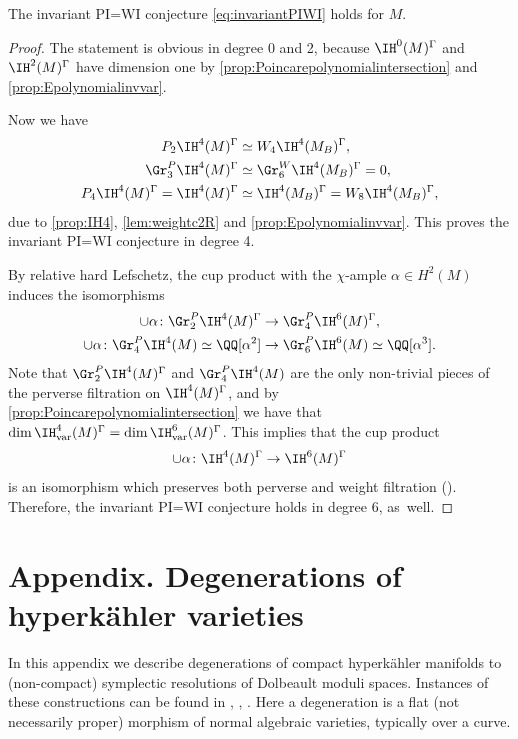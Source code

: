 \begin{thm}\label{thm:P=Winvar}
The invariant PI=WI conjecture \eqref{eq:invariantPIWI} holds for $M$.
\end{thm}
\begin{proof}
The statement is obvious in degree 0 and 2, because $\IH^0(M)^{\Gamma}$ and $\IH^2(M)^{\Gamma}$ have dimension one by \cref{prop:Poincarepolynomialintersection} and \cref{prop:Epolynomialinvvar}.

Now we have
\begin{align*}
P_2 \IH^4(M)^{\Gamma} & \simeq W_4 \IH^4(M_B)^{\Gamma},\\
\Gr^P_3 \IH^4(M)^{\Gamma} & \simeq \Gr^W_6 \IH^4(M_B)^{\Gamma} = 0, \\
P_4 \IH^4(M)^{\Gamma} = \IH^4(M)^{\Gamma} & \simeq \IH^4(M_B)^{\Gamma} = W_8 \IH^4(M_B)^{\Gamma},
\end{align*}
due to \cref{prop:IH4}, \cref{lem:weightc2R} and \cref{prop:Epolynomialinvvar}. This proves the invariant PI=WI conjecture in degree 4.

By relative hard Lefschetz, the cup product with the $\chi$-ample $\alpha \in H^{2}(M)$
induces the isomorphisms
\begin{align*}
\cup \alpha\colon \Gr^P_2 \IH^4(M)^{\Gamma} & \to \Gr^P_4 \IH^6(M)^{\Gamma},\\
\cup \alpha\colon \Gr^P_4 \IH^4(M) \simeq \QQ [\alpha^2] & \to \Gr^P_6 \IH^6(M) \simeq \QQ [\alpha^3].
\end{align*}
Note that $\Gr^P_2 \IH^4(M)^{\Gamma}$ and $\Gr^P_4 \IH^4(M)$ are the only non-trivial pieces of the perverse filtration on $\IH^4(M)^{\Gamma}$, and by \cref{prop:Poincarepolynomialintersection} we have that $\dim \IH_{\mathrm{var}}^4(M)^{\Gamma} = \dim \IH_{\mathrm{var}}^6(M)^{\Gamma}$.
This implies that the cup product
\[
\cup \alpha\colon \IH^4(M)^{\Gamma} \to \IH^6(M)^{\Gamma}
\]
is an isomorphism which preserves both perverse and weight filtration (\cf \cite[Lem.\,1.4.4]{deCataldoHauselMigliorini2012}). Therefore, the invariant PI=WI conjecture holds in degree $6$, as~well.
\end{proof}

\appendix
\section*{Appendix. Degenerations of hyperkähler varieties}
\label{appendix:deg}

In this appendix we describe degenerations of compact hyperkähler manifolds to (non-compact) symplectic resolutions of Dolbeault moduli spaces. Instances of these constructions can be found in \cite{DEL97}, \cite{deCataldoMaulikShen2019}, \cite{deCataldoMaulikShen2020}. Here a degeneration is a flat (not necessarily proper) morphism of normal algebraic varieties, typically over a curve.

